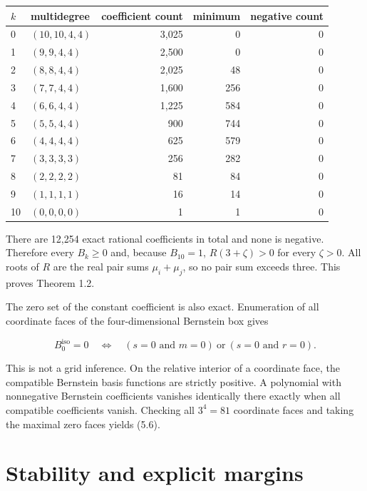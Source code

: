 \documentclass[11pt]{article}
\begin{document}
\begin{center}
\begin{tabularx}{\textwidth}{@{}Y Y R R R@{}}
\toprule
$k$ & multidegree & coefficient count & minimum & negative count \\
 & $(10,10,4,4)$ & 3,025 & 0 & 0 \\
1 & $(9,9,4,4)$ & 2,500 & 0 & 0 \\
2 & $(8,8,4,4)$ & 2,025 & 48 & 0 \\
3 & $(7,7,4,4)$ & 1,600 & 256 & 0 \\
4 & $(6,6,4,4)$ & 1,225 & 584 & 0 \\
5 & $(5,5,4,4)$ & 900 & 744 & 0 \\
6 & $(4,4,4,4)$ & 625 & 579 & 0 \\
7 & $(3,3,3,3)$ & 256 & 282 & 0 \\
8 & $(2,2,2,2)$ & 81 & 84 & 0 \\
9 & $(1,1,1,1)$ & 16 & 14 & 0 \\
10 & $(0,0,0,0)$ & 1 & 1 & 0 \\
\bottomrule
\end{tabularx}
\end{center}

There are 12,254 exact rational coefficients in total and none is negative. Therefore every $B_k\ge0$ and, because $B_{10}=1$, $R(3+\zeta)>0$ for every $\zeta>0$. All roots of $R$ are the real pair sums $\mu_i+\mu_j$, so no pair sum exceeds three. This proves Theorem 1.2.

The zero set of the constant coefficient is also exact. Enumeration of all coordinate faces of the four-dimensional Bernstein box gives

\begin{equation}
B_0^{\mathrm{iso}}=0
\quad\Longleftrightarrow\quad
(s=0\text{ and }m=0)\ \text{or}\ (s=0\text{ and }r=0).
\tag{5.6}
\end{equation}

This is not a grid inference. On the relative interior of a coordinate face, the compatible Bernstein basis functions are strictly positive. A polynomial with nonnegative Bernstein coefficients vanishes identically there exactly when all compatible coefficients vanish. Checking all $3^4=81$ coordinate faces and taking the maximal zero faces yields (5.6).

\section{Stability and explicit margins}
\end{document}
